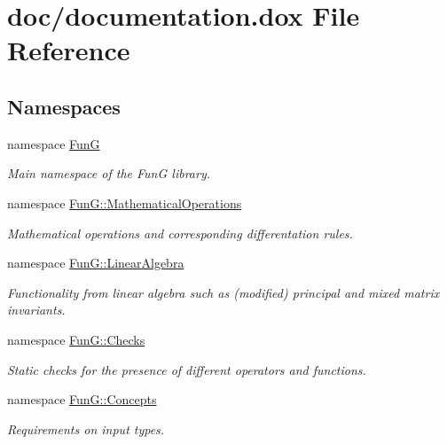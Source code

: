 \hypertarget{documentation_8dox}{\section{doc/documentation.dox \-File \-Reference}
\label{documentation_8dox}
}
\subsection*{\-Namespaces}
\begin{DoxyCompactItemize}
\item 
namespace \hyperlink{namespaceFunG}{\-Fun\-G}
\begin{DoxyCompactList}\small\item\em \-Main namespace of the \-Fun\-G library. \end{DoxyCompactList}\item 
namespace \hyperlink{namespaceFunG_1_1MathematicalOperations}{\-Fun\-G\-::\-Mathematical\-Operations}
\begin{DoxyCompactList}\small\item\em \-Mathematical operations and corresponding differentation rules. \end{DoxyCompactList}\item 
namespace \hyperlink{namespaceFunG_1_1LinearAlgebra}{\-Fun\-G\-::\-Linear\-Algebra}
\begin{DoxyCompactList}\small\item\em \-Functionality from linear algebra such as (modified) principal and mixed matrix invariants. \end{DoxyCompactList}\item 
namespace \hyperlink{namespaceFunG_1_1Checks}{\-Fun\-G\-::\-Checks}
\begin{DoxyCompactList}\small\item\em \-Static checks for the presence of different operators and functions. \end{DoxyCompactList}\item 
namespace \hyperlink{namespaceFunG_1_1Concepts}{\-Fun\-G\-::\-Concepts}
\begin{DoxyCompactList}\small\item\em \-Requirements on input types. \end{DoxyCompactList}\end{DoxyCompactItemize}
